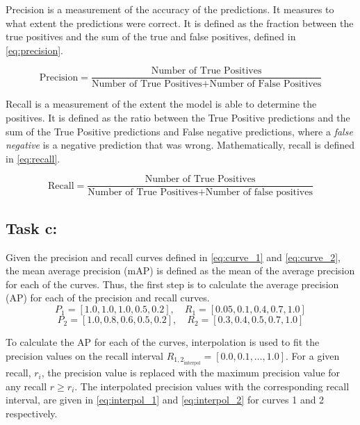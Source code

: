 \documentclass{article}
\begin{document}
Precision is a measurement of the accuracy of the predictions. It measures to what extent the predictions were correct. It is defined as the fraction between the true positives and the sum of the true and false positives, defined in \autoref{eq:precision}.

\begin{equation}
    \text{Precision} = \frac{\text{Number of True Positives}}{\text{Number of True Positives} + \text{Number of False Positives}}
    \label{eq:precision}
\end{equation}

Recall is a measurement of the extent the model is able to determine the positives. It is defined as the ratio between the True Positive predictions and the sum of the True Positive predictions and False negative predictions, where a \textit{false negative} is a negative prediction that was wrong. Mathematically, recall is defined in \autoref{eq:recall}.

\begin{equation}
    \text{Recall} = \frac{\text{Number of True Positives}}{\text{Number of True Positives} + \text{Number of false positives}}
    \label{eq:recall}
\end{equation}

\subsection{Task c:}
Given the precision and recall curves defined in \autoref{eq:curve_1} and \autoref{eq:curve_2}, the mean average precision (mAP) is defined as the mean of the average precision for each of the curves. Thus, the first step is to calculate the average precision (AP) for each of the precision and recall curves.
\begin{equation}
    P_1 = [1.0, 1.0, 1.0, 0.5, 0.2], \quad R_1 = [0.05, 0.1, 0.4, 0.7, 1.0]
    \label{eq:curve_1}
\end{equation}
\begin{equation}
    P_2 = [1.0, 0.8, 0.6, 0.5, 0.2], \quad R_2 = [0.3, 0.4, 0.5, 0.7, 1.0]
    \label{eq:curve_2}
\end{equation}

To calculate the AP for each of the curves, interpolation is used to fit the precision values on the recall interval $R_{1,2}_{\text{interpol}} = [0.0, 0.1, \dots, 1.0]$. For a given recall, $r_i$, the precision value is replaced with the maximum precision value for any recall $r \geq r_i$. The interpolated precision values with the corresponding recall interval, are given in \autoref{eq:interpol_1} and \eqref{eq:interpol_2} for curves 1 and 2 respectively.
\end{document}
